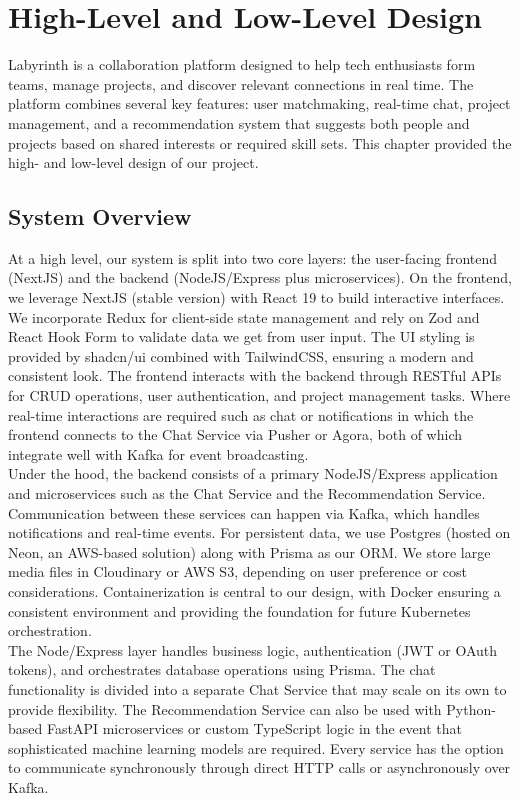 \documentclass{FastFyp}
\begin{document}
\chapter{High-Level and Low-Level Design}
Labyrinth is a collaboration platform designed to help tech enthusiasts form teams, manage projects, and discover relevant connections in real time. The platform combines several key features: user matchmaking, real-time chat, project management, and a recommendation system that suggests both people and projects based on shared interests or required skill sets. This chapter provided the high- and low-level design of our project.
\section{System Overview}
At a high level, our system is split into two core layers: the user-facing frontend (NextJS) and the backend (NodeJS/Express plus microservices). On the frontend, we leverage NextJS (stable version) with React 19 to build interactive interfaces. We incorporate Redux for client-side state management and rely on Zod and React Hook Form to validate data we get from user input. The UI styling is provided by shadcn/ui combined with TailwindCSS, ensuring a modern and consistent look. The frontend interacts with the backend through RESTful APIs for CRUD operations, user authentication, and project management tasks. Where real-time interactions are required such as chat or notifications in which the frontend connects to the Chat Service via Pusher or Agora, both of which integrate well with Kafka for event broadcasting. 
\\
Under the hood, the backend consists of a primary NodeJS/Express application and microservices such as the Chat Service and the Recommendation Service. Communication between these services can happen via Kafka, which handles notifications and real-time events. For persistent data, we use Postgres (hosted on Neon, an AWS-based solution) along with Prisma as our ORM. We store large media files in Cloudinary or AWS S3, depending on user preference or cost considerations. Containerization is central to our design, with Docker ensuring a consistent environment and providing the foundation for future Kubernetes orchestration.
\\
The Node/Express layer handles business logic, authentication (JWT or OAuth tokens), and orchestrates database operations using Prisma. The chat functionality is divided into a separate Chat Service that may scale on its own to provide flexibility.  The Recommendation Service can also be used with Python-based FastAPI microservices or custom TypeScript logic in the event that sophisticated machine learning models are required.  Every service has the option to communicate synchronously through direct HTTP calls or asynchronously over Kafka. 
\end{document}
